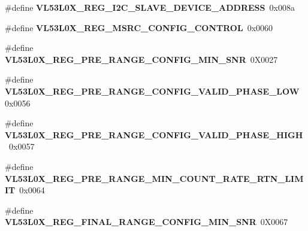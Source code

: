 \begin{DoxyCompactItemize}
\#define {\bfseries V\+L53\+L0\+X\+\_\+\+R\+E\+G\+\_\+\+I2\+C\+\_\+\+S\+L\+A\+V\+E\+\_\+\+D\+E\+V\+I\+C\+E\+\_\+\+A\+D\+D\+R\+E\+SS}~0x008a
\item 
\mbox{\label{group__VL53L0X__DefineRegisters__group_ga136bdf3400372259d9165a8a2d85eb49}} 
\#define {\bfseries V\+L53\+L0\+X\+\_\+\+R\+E\+G\+\_\+\+M\+S\+R\+C\+\_\+\+C\+O\+N\+F\+I\+G\+\_\+\+C\+O\+N\+T\+R\+OL}~0x0060
\item 
\mbox{\label{group__VL53L0X__DefineRegisters__group_ga4288661e82b735fddf1b2b512d242d4d}} 
\#define {\bfseries V\+L53\+L0\+X\+\_\+\+R\+E\+G\+\_\+\+P\+R\+E\+\_\+\+R\+A\+N\+G\+E\+\_\+\+C\+O\+N\+F\+I\+G\+\_\+\+M\+I\+N\+\_\+\+S\+NR}~0\+X0027
\item 
\mbox{\label{group__VL53L0X__DefineRegisters__group_ga6132c4f4352120efcba0296c03a09b6b}} 
\#define {\bfseries V\+L53\+L0\+X\+\_\+\+R\+E\+G\+\_\+\+P\+R\+E\+\_\+\+R\+A\+N\+G\+E\+\_\+\+C\+O\+N\+F\+I\+G\+\_\+\+V\+A\+L\+I\+D\+\_\+\+P\+H\+A\+S\+E\+\_\+\+L\+OW}~0x0056
\item 
\mbox{\label{group__VL53L0X__DefineRegisters__group_gaf62cc73a306bc0fa69ed4690952b0064}} 
\#define {\bfseries V\+L53\+L0\+X\+\_\+\+R\+E\+G\+\_\+\+P\+R\+E\+\_\+\+R\+A\+N\+G\+E\+\_\+\+C\+O\+N\+F\+I\+G\+\_\+\+V\+A\+L\+I\+D\+\_\+\+P\+H\+A\+S\+E\+\_\+\+H\+I\+GH}~0x0057
\item 
\mbox{\label{group__VL53L0X__DefineRegisters__group_gad0af40dfad234de676ea20941998b486}} 
\#define {\bfseries V\+L53\+L0\+X\+\_\+\+R\+E\+G\+\_\+\+P\+R\+E\+\_\+\+R\+A\+N\+G\+E\+\_\+\+M\+I\+N\+\_\+\+C\+O\+U\+N\+T\+\_\+\+R\+A\+T\+E\+\_\+\+R\+T\+N\+\_\+\+L\+I\+M\+IT}~0x0064
\item 
\mbox{\label{group__VL53L0X__DefineRegisters__group_ga23391c8e510f910a5caecf48713cc1a7}} 
\#define {\bfseries V\+L53\+L0\+X\+\_\+\+R\+E\+G\+\_\+\+F\+I\+N\+A\+L\+\_\+\+R\+A\+N\+G\+E\+\_\+\+C\+O\+N\+F\+I\+G\+\_\+\+M\+I\+N\+\_\+\+S\+NR}~0\+X0067
\item 
\mbox{\label{group__VL53L0X__DefineRegisters__group_gabe44b1496fe8eefdaf477cba2e5964be}} 

\end{DoxyCompactItemize}
